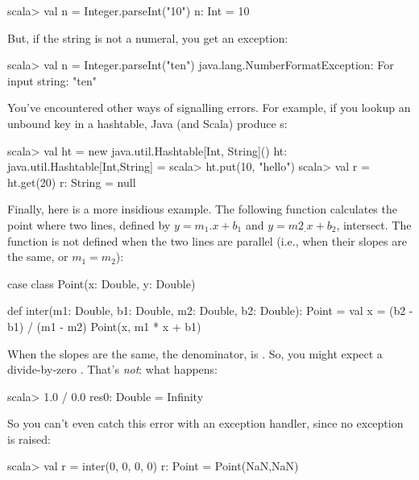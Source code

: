 \documentclass{book}
\begin{document}
\begin{console}
scala> val n = Integer.parseInt("10")
n: Int = 10
\end{console}

But, if the string is not a numeral, you get an exception:

\begin{console}
scala> val n = Integer.parseInt("ten")
java.lang.NumberFormatException: For input string: "ten"
\end{console}

You've encountered other ways of signalling errors. For example, if you lookup
an unbound key in a hashtable, Java (and Scala) produce s:

\begin{console}
scala> val ht = new java.util.Hashtable[Int, String]()
ht: java.util.Hashtable[Int,String] = {}
scala> ht.put(10, "hello")
scala> val r = ht.get(20)
r: String = null
\end{console}

Finally, here is a more insidious example. The following function calculates the
point where two lines, defined by $y = m_1.x + b_1$ and $y = m2_.x + b_2$, intersect.
The function is not defined when the two lines are parallel (i.e., when their
slopes are the same, or $m_1 = m_2$):

\begin{scalacode}
 case class Point(x: Double, y: Double)

 def inter(m1: Double, b1: Double, m2: Double, b2: Double): Point = {
   val x = (b2 - b1) / (m1 - m2)
   Point(x, m1 * x + b1)
 }
\end{scalacode}

When the slopes are the same, the denominator,  is
. So, you
might expect a divide-by-zero . That's \emph{not}:
what happens:

\begin{console}
scala> 1.0 / 0.0
res0: Double = Infinity
\end{console}

So you can't even catch this error with an exception handler, since no exception
is raised:

\begin{console}
scala> val r = inter(0, 0, 0, 0)
r: Point = Point(NaN,NaN)
\end{console}
\end{document}
